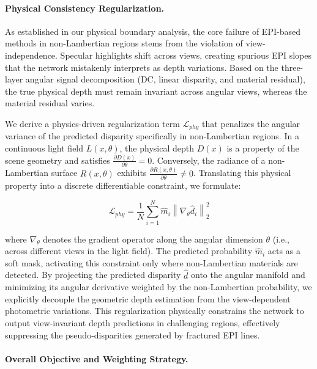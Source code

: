 \paragraph{Physical Consistency Regularization.}

As established in our physical boundary analysis, the core failure of EPI-based methods in non-Lambertian regions stems from the violation of view-independence. Specular highlights shift across views, creating spurious EPI slopes that the network mistakenly interprets as depth variations. Based on the three-layer angular signal decomposition (DC, linear disparity, and material residual), the true physical depth must remain invariant across angular views, whereas the material residual varies. 

We derive a physics-driven regularization term $\mathcal{L}_{phy}$ that penalizes the angular variance of the predicted disparity specifically in non-Lambertian regions. In a continuous light field $L(x, \theta)$, the physical depth $D(x)$ is a property of the scene geometry and satisfies $\frac{\partial D(x)}{\partial \theta} = 0$. Conversely, the radiance of a non-Lambertian surface $R(x, \theta)$ exhibits $\frac{\partial R(x, \theta)}{\partial \theta} \neq 0$. Translating this physical property into a discrete differentiable constraint, we formulate:

\begin{equation}
\label{eq:eq27}
\mathcal{L}_{phy} = \frac{1}{N} \sum_{i=1}^{N} \hat{m}_i \left\| \nabla_{\theta} \hat{d}_i \right\|_2^2
\end{equation}

where $\nabla_{\theta}$ denotes the gradient operator along the angular dimension $\theta$ (i.e., across different views in the light field). The predicted probability $\hat{m}_i$ acts as a soft mask, activating this constraint only where non-Lambertian materials are detected. By projecting the predicted disparity $\hat{d}$ onto the angular manifold and minimizing its angular derivative weighted by the non-Lambertian probability, we explicitly decouple the geometric depth estimation from the view-dependent photometric variations. This regularization physically constrains the network to output view-invariant depth predictions in challenging regions, effectively suppressing the pseudo-disparities generated by fractured EPI lines.

\paragraph{Overall Objective and Weighting Strategy.}


